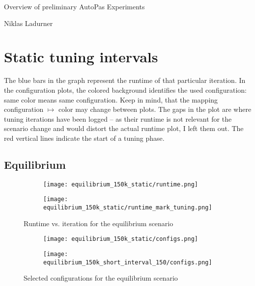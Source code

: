 \documentclass[]{article}
\newcommand{\msubtitle}{Overview of preliminary AutoPas Experiments}
\newcommand{\mauthor}{Niklas Ladurner}
\begin{document}
\begin{center}\LARGE\msubtitle\end{center}
\begin{center}\normalsize\mauthor\end{center}

\section{Static tuning intervals}
The blue bars in the graph represent the runtime of that particular iteration.
In the configuration plots, the colored background identifies the used configuration: same color means same configuration. Keep in mind, that the mapping configuration $\mapsto$ color may change between plots. The gaps in the plot are where tuning iterations have been logged -- as their runtime is not relevant for the scenario change and would distort the actual runtime plot, I left them out. The red vertical lines indicate the start of a tuning phase.

\subsection{Equilibrium}

\begin{figure}[htpb]
	\begin{center}
		\begin{subfigure}[b]{0.45\textwidth}
			\texttt{[image: equilibrium\_150k\_static/runtime.png]}
		\end{subfigure}
		\begin{subfigure}[b]{0.45\textwidth}
			\texttt{[image: equilibrium\_150k\_static/runtime\_mark\_tuning.png]}
		\end{subfigure}
	\end{center}
	\caption[]{Runtime vs. iteration for the equilibrium scenario}
	\label{fig_equil_runtime}
\end{figure}

\begin{figure}[htpb]
	\begin{center}
		\begin{subfigure}[b]{0.45\textwidth}
			\texttt{[image: equilibrium\_150k\_static/configs.png]}
		\end{subfigure}
		\begin{subfigure}[b]{0.45\textwidth}
			\texttt{[image: equilibrium\_150k\_short\_interval\_150/configs.png]}
		\end{subfigure}
	\end{center}
	\caption[]{Selected configurations for the equilibrium scenario}
	\label{fig_equil_configs}
\end{figure}
\end{document}
